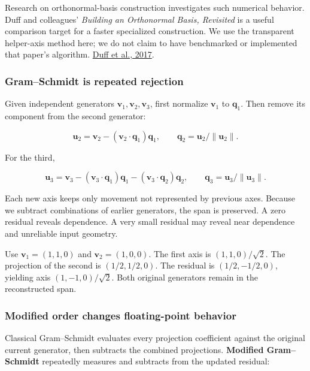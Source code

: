 Research on orthonormal-basis construction investigates such numerical behavior. Duff and colleagues' \emph{Building an Orthonormal Basis, Revisited} is a useful comparison target for a faster specialized construction. We use the transparent helper-axis method here; we do not claim to have benchmarked or implemented that paper's algorithm. \href{https://graphics.pixar.com/library/OrthonormalB/paper.pdf}{Duff et al., 2017}.

\subsubsection{Gram--Schmidt is repeated rejection}\label{gramschmidt-is-repeated-rejection}

Given independent generators \(\mathbf v_1,\mathbf v_2,\mathbf v_3\), first normalize \(\mathbf v_1\) to \(\mathbf q_1\). Then remove its component from the second generator:

\[
\mathbf u_2=\mathbf v_2-(\mathbf v_2\cdot\mathbf q_1)\mathbf q_1,
\qquad \mathbf q_2=\mathbf u_2/\|\mathbf u_2\|.
\]

For the third,

\[
\mathbf u_3=\mathbf v_3
-(\mathbf v_3\cdot\mathbf q_1)\mathbf q_1
-(\mathbf v_3\cdot\mathbf q_2)\mathbf q_2,
\qquad \mathbf q_3=\mathbf u_3/\|\mathbf u_3\|.
\]

Each new axis keeps only movement not represented by previous axes. Because we subtract combinations of earlier generators, the span is preserved. A zero residual reveals dependence. A very small residual may reveal near dependence and unreliable input geometry.

Use \(\mathbf v_1=(1,1,0)\) and \(\mathbf v_2=(1,0,0)\). The first axis is \((1,1,0)/\sqrt2\). The projection of the second is \((1/2,1/2,0)\). The residual is \((1/2,-1/2,0)\), yielding axis \((1,-1,0)/\sqrt2\). Both original generators remain in the reconstructed span.

\subsubsection{Modified order changes floating-point behavior}\label{modified-order-changes-floating-point-behavior}

Classical Gram--Schmidt evaluates every projection coefficient against the original current generator, then subtracts the combined projections. \textbf{Modified Gram--Schmidt} repeatedly measures and subtracts from the updated residual:

